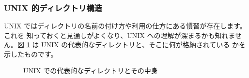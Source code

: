 \documentclass[platex]{jsarticle}
\begin{document}
  \subsubsection{UNIX 的ディレクトリ構造}
 UNIX ではディレクトリの名前の付け方や利用の仕方にある慣習が存在します。これを
 知っておくと見通しがよくなり、UNIX への理解が深まるかも知れません。図
 \ref{fig:fs-tree} は UNIX の代表的なディレクトリと、そこに何が格納されている
 かを示したものです。
 \begin{figure}[h]
  \begin{center}
  \end{center}
  \caption{UNIX での代表的なディレクトリとその中身}
  \label{fig:fs-tree}
 \end{figure}
\end{document}
